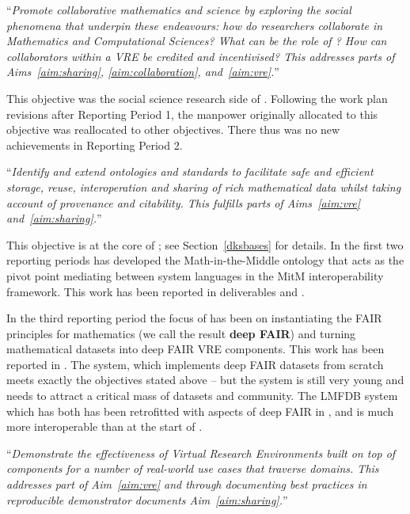 \begin{compactenum}[\bf O1\rm:]
\item \label{objective:social} ``\emph{Promote collaborative mathematics and
  science by exploring the social phenomena that underpin these
  endeavours: how do researchers collaborate in Mathematics and
  Computational Sciences?  What can be the role of \VREs?  How can
  collaborators within a VRE be credited and incentivised? This
  addresses parts of Aims~\ref{aim:sharing}, \ref{aim:collaboration},
  and~\ref{aim:vre}.}''

This objective was the social science research side of
. Following the work plan revisions after
Reporting Period 1, the manpower originally allocated to this
objective was reallocated to other objectives. There thus was no new
achievements in Reporting Period 2.

\item \label{objective:data} ``\emph{Identify and extend ontologies and
  standards to facilitate safe and efficient storage, reuse,
  interoperation and sharing of rich mathematical data whilst taking
  account of provenance and citability. This fulfills parts of
  Aims~\ref{aim:vre} and~\ref{aim:sharing}.}''
 
This objective is at the core of ; see Section~\ref{dksbases} for details.
In the first two reporting periods  has developed the Math-in-the-Middle ontology that acts as the pivot point mediating between system languages in the MitM interoperability framework.
This work has been reported in deliverables  and .

In the third reporting period the focus of  has been on instantiating the FAIR principles for mathematics (we call the result \textbf{deep FAIR}) and turning mathematical datasets into deep FAIR VRE components.
This work has been reported in .
The \dmh system, which implements deep FAIR datasets from scratch meets exactly the objectives stated above -- but the system is still very young and needs to attract a critical mass of datasets and community.
The LMFDB system which has both has been retrofitted with aspects of deep FAIR in \pn, and is much more interoperable than at the start of \pn. 

\item \label{objective:demo} ``\emph{Demonstrate the effectiveness of Virtual
  Research Environments built on top of \ODK components for a
  number of real-world use cases that traverse domains. This addresses
  part of Aim~\ref{aim:vre} and through documenting best practices in
  reproducible demonstrator documents Aim~\ref{aim:sharing}.}''


\end{compactenum}
